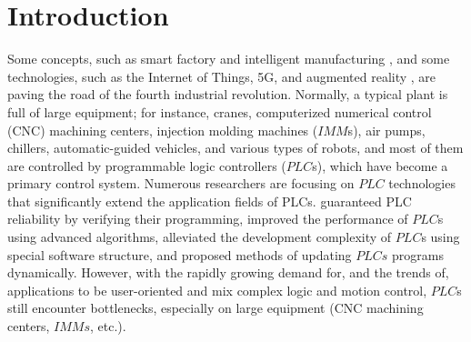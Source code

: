 \documentclass[journal,UTF8]{IEEEtran}
\begin{document}
	\IEEEpeerreviewmaketitle
	
	
	
	\section{Introduction}
	Some concepts, such as smart factory and intelligent manufacturing \cite{Chekired2018Industrial,cheng2018industrial}, and some technologies, such as the Internet of Things, 5G, and augmented reality \textcolor{red}{\cite{da2014internet,Liu2016Traversing,Li20185G}}, are paving the road of the fourth industrial revolution. Normally, a typical plant is full of large equipment; for instance, cranes, computerized numerical control (CNC) machining centers, injection molding machines ($IMM$s), air pumps, chillers, automatic-guided vehicles, and various types of robots, and most of them are controlled by programmable logic controllers ($PLC$s), which have become a primary control system. Numerous researchers are focusing on $PLC$ technologies that significantly extend the application fields of PLCs. \cite{Jiang2013System,Jiang2013Bayesian,Adiego2015Applying} guaranteed PLC reliability by verifying their programming, \cite{Gerk2006Advanced,Chang2007Adaptive,Dominic2016PLC} improved the performance of $PLC$s using advanced algorithms, \cite{wu2018customized} alleviated the development complexity of $PLC$s using special software structure, and \cite{Sch2013Development,Morenas2017Shop} proposed methods of updating $PLCs$ programs dynamically.
	However, with the rapidly growing demand for, and the trends of, applications to be user-oriented and mix complex logic and motion control\cite{Zaeh2005A,Hossain2014Advanced}, $PLC$s still encounter bottlenecks, especially on large equipment (CNC machining centers, $IMMs$, etc.).
	
\end{document}
